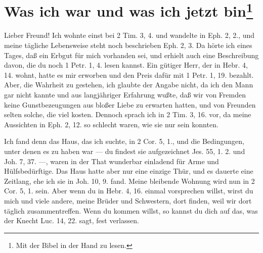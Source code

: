 \chapter[Was ich war und was ich jetzt bin]{Was ich war und was ich jetzt bin\footnote{Mit der Bibel in der Hand zu lesen.}}

Lieber Freund! Ich wohnte einst bei 2 Tim. 3, 4. und wandelte in Eph. 2, 2., und meine tägliche Lebensweise steht noch beschrieben Eph. 2, 3. Da hörte ich eines Tages, daß ein Erbgut für mich vorhanden sei, und erhielt auch eine Beschreibung davon, die du noch 1 Petr. 1, 4. lesen kannst. Ein gütiger Herr, der in Hebr. 4, 14. wohnt, hatte es mir erworben und den Preis dafür mit 1 Petr. 1, 19. bezahlt. Aber, die Wahrheit zu gestehen, ich glaubte der Angabe nicht, da ich den Mann gar nicht kannte und aus langjähriger Erfahrung wußte, daß wir von Fremden keine Gunstbezeugungen aus bloßer Liebe zu erwarten hatten, und von Freunden selten solche, die viel kosten. Dennoch sprach ich in 2 Tim. 3, 16. vor, da meine Aussichten in Eph. 2, 12. so schlecht waren, wie sie nur sein konnten.

Ich fand denn das Haus, das ich suchte, in 2 Cor. 5, 1., und die Bedingungen, unter denen es zu haben war — du findest sie aufgezeichnet Jes. 55, 1. 2. und Joh. 7, 37. —, waren in der That wunderbar einladend für Arme und Hülfsbedürftige. Das Haus hatte aber nur eine einzige Thür, und es dauerte eine Zeitlang, ehe ich sie in Joh. 10, 9. fand. Meine bleibende Wohnung wird nun in 2 Cor. 5, 1. sein. Aber wenn du in Hebr. 4, 16. einmal vorsprechen willst, wirst du mich und viele andere, meine Brüder und Schwestern, dort finden, weil wir dort täglich zusammentreffen. Wenn du kommen willst, so kannst du dich auf das, was der Knecht Luc. 14, 22. sagt, fest verlassen.
